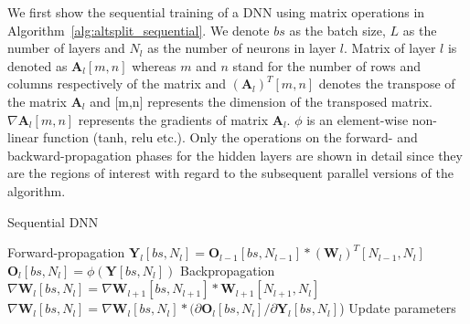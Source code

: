 We first show the sequential training of a DNN using matrix operations in 
Algorithm~\ref{alg:altsplit_sequential}. We denote $bs$ as the batch size, $L$ 
as the number of layers and $N_l$ as the number of neurons in layer $l$. Matrix 
of layer $l$ is denoted as $\pmb{A}_l[m,n]$ whereas $m$ and $n$ stand for the 
number of rows and columns respectively of the matrix and $(\pmb{A}_l)^T[m,n]$ 
denotes the transpose of the matrix $\pmb{A}_l$ and [m,n] represents the 
dimension of the transposed matrix.  $\nabla \pmb{A}_l[m,n]$ represents the 
gradients of matrix $\pmb{A}_l$. $\phi$ is an element-wise non-linear function 
(tanh, relu etc.). Only the operations on the forward- and backward-propagation 
phases for the hidden layers are shown in detail since they are the regions of 
interest with regard to the subsequent parallel versions of the algorithm.
\begin{algorithm}[H]%
\caption{Sequential DNN}
\label{alg:altsplit_sequential}
{\fontsize{10}{10}\selectfont
\begin{algorithmic}[1]
    \Comment Forward-propagation \State $\pmb{Y}_l[bs, N_l] = \pmb{O}_{l-1}[bs, N_{l-1}] * (\pmb{W}_{l})^T[N_{l-1}, N_l]$
        \State $\pmb{O}_l[bs, N_l] = \phi(\pmb{Y}[bs, N_l])$
    \EndFor
    \Comment Backpropagation 
        \State $\nabla \pmb{W}_l[bs, N_l]  = \nabla \pmb{W}_{l+1}[bs, N_{l+1}] * \pmb{W}_{l+1}[N_{l+1}, N_l]$
        \State $\nabla \pmb{W}_l[bs, N_l] = \nabla \pmb{W}_l[bs, N_l] * (\partial \pmb{O}_l[bs, N_l] / \partial \pmb{Y}_l[bs, N_l]$)
    \EndFor
    \State Update parameters
\end{algorithmic}}
\end{algorithm}

